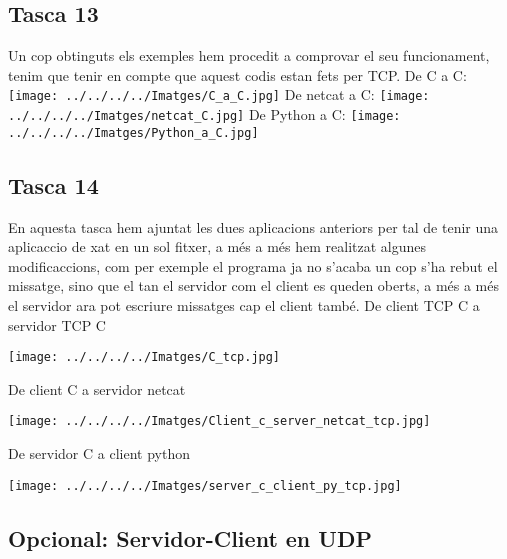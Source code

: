 \documentclass[11p]{article}
\begin{document}
\subsection{Tasca 13}

Un cop obtinguts els exemples hem procedit a comprovar el seu funcionament, tenim que tenir en compte que aquest codis estan fets per TCP.
\newline
De C a C:
\newline
\texttt{[image: ../../../../Imatges/C\_a\_C.jpg]} 
\newline
De netcat a C:
\newline
\texttt{[image: ../../../../Imatges/netcat\_C.jpg]}
\newline
De Python a C:
\newline
\texttt{[image: ../../../../Imatges/Python\_a\_C.jpg]} 
\newpage
\subsection{Tasca 14}

En aquesta tasca hem ajuntat les dues aplicacions anteriors per tal de tenir una aplicaccio de xat en un sol fitxer, a més a més hem realitzat algunes modificaccions, com per exemple el programa ja no s'acaba un cop s'ha rebut el missatge, sino que el tan el servidor com el client es queden oberts, a més a més el servidor ara pot escriure missatges cap el client també.
\newline
De client TCP C a servidor TCP C
\newline
\newline
\centerline{\texttt{[image: ../../../../Imatges/C\_tcp.jpg]} }
\newline
\newline
De client C a servidor netcat
\newline
\newline
\centerline{\texttt{[image: ../../../../Imatges/Client\_c\_server\_netcat\_tcp.jpg]} }
\newline
De servidor C a client python
\newline
\newline
\centerline{\texttt{[image: ../../../../Imatges/server\_c\_client\_py\_tcp.jpg]}} 
\newline
\newpage
\subsection{Opcional: Servidor-Client en UDP}
\end{document}
